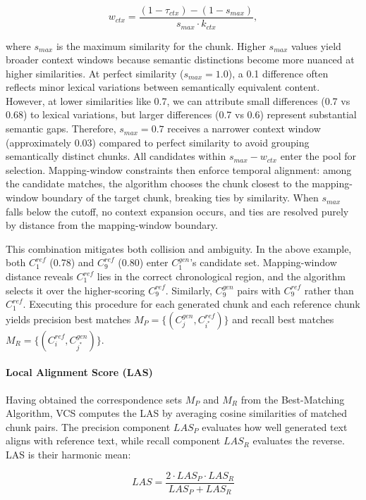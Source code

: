 \documentclass[letterpaper]{article} %
\begin{document}
\begin{equation}
w_{ctx} = \frac{(1-\tau_{ctx})-(1-s_{max})}{s_{max} \cdot k_{ctx}},
\end{equation}

where $s_{max}$ is the maximum similarity for the chunk. Higher $s_{max}$ values yield broader context windows because semantic distinctions become more nuanced at higher similarities. At perfect similarity ($s_{max} = 1.0$), a 0.1 difference often reflects minor lexical variations between semantically equivalent content. However, at lower similarities like 0.7, we can attribute small differences (0.7 vs 0.68) to lexical variations, but larger differences (0.7 vs 0.6) represent substantial semantic gaps. Therefore, $s_{max} = 0.7$ receives a narrower context window (approximately 0.03) compared to perfect similarity to avoid grouping semantically distinct chunks. All candidates within $s_{max} - w_{ctx}$ enter the pool for selection. Mapping-window constraints then enforce temporal alignment: among the candidate matches, the algorithm chooses the chunk closest to the mapping-window boundary of the target chunk, breaking ties by similarity. When $s_{max}$ falls below the cutoff, no context expansion occurs, and ties are resolved purely by distance from the mapping-window boundary.

This combination mitigates both collision and ambiguity. In the above example, both $C_1^{ref}$ (0.78) and $C_9^{ref}$ (0.80) enter $C_1^{gen}$'s candidate set. Mapping-window distance reveals $C_1^{ref}$ lies in the correct chronological region, and the algorithm selects it over the higher-scoring $C_9^{ref}$. Similarly, $C_9^{gen}$ pairs with $C_9^{ref}$ rather than $C_1^{ref}$. Executing this procedure for each generated chunk and each reference chunk yields precision best matches $M_P = \{(C_j^{gen}, C_{i^*}^{ref})\}$ and recall best matches $M_R = \{(C_i^{ref}, C_{j^*}^{gen})\}$.

\paragraph{Local Alignment Score (LAS)}
Having obtained the correspondence sets $M_P$ and $M_R$ from the Best-Matching Algorithm, VCS computes the LAS by averaging cosine similarities of matched chunk pairs. The precision component $LAS_P$ evaluates how well generated text aligns with reference text, while recall component $LAS_R$ evaluates the reverse. LAS is their harmonic mean:

\begin{equation}
LAS = \frac{2 \cdot LAS_P \cdot LAS_R}{LAS_P + LAS_R}
\end{equation}
\end{document}
